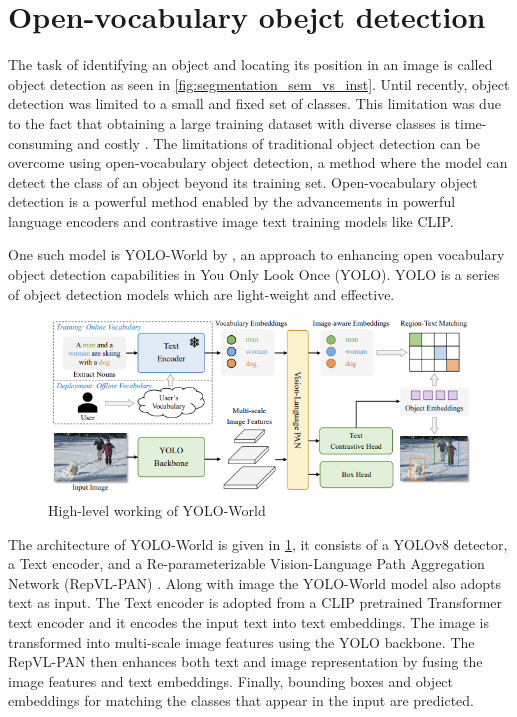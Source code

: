 \section{Open-vocabulary obejct detection}
The task of identifying an object and locating its position in an image is called object detection as seen in \cref{fig:segmentation_sem_vs_inst}. Until recently, object detection was limited to a small and fixed
set of classes. This limitation was due to the fact that obtaining a large training dataset with diverse classes is time-consuming and costly \cite{10.1007/978-3-031-20080-9_42}. 
The limitations of traditional object detection can be overcome using open-vocabulary object detection, a method where the model can detect the class of an 
object beyond its training set. Open-vocabulary object detection is a powerful method enabled by the advancements in powerful language encoders 
and contrastive image text training models like CLIP. 

One such model is YOLO-World by \citet{cheng2024yolow}, an approach to enhancing open vocabulary object detection capabilities in You Only Look Once (YOLO).
YOLO is a series of object detection models which are light-weight and effective. 
\begin{figure}[ht!]
    \centering
    \includegraphics[width=\textwidth]{content/images/YOLOWorld.png}
    \caption{High-level working of YOLO-World \cite{cheng2024yolow}}
    \label{fig:yolo}
\end{figure}

The architecture of YOLO-World is given in \cref{fig:yolo}, it consists of a YOLOv8 detector, a Text encoder, and a Re-parameterizable Vision-Language
Path Aggregation Network (RepVL-PAN) \cite{cheng2024yolow}. Along with image the YOLO-World model also adopts text as input. The Text encoder is adopted
from a CLIP pretrained Transformer text encoder and it encodes the input text into text embeddings. The image is transformed into multi-scale image features using the 
YOLO backbone. The RepVL-PAN then enhances both text and image representation by fusing the image features and text embeddings. Finally, bounding boxes and object 
embeddings for matching the classes that appear in the input are predicted.


